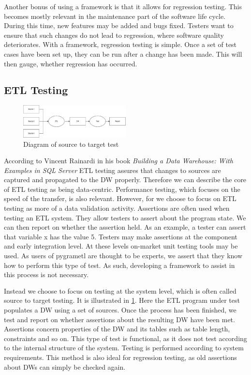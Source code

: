 Another bonus of using a framework is that it allows for regression testing. This becomes mostly relevant in the maintenance part of the software life cycle. During this time, new features may be added and bugs fixed. Testers want to ensure that such changes do not lead to regression, where software quality deteriorates. With a framework, regression testing is simple. Once a set of test cases have been set up, they can be run after a change has been made. This will then gauge, whether regression has occurred.

\subsection{ETL Testing}

\begin{figure}
\centering
\includegraphics[width=0.5\textwidth]{figures/scenario.pdf}
\caption{Diagram of source to target test}
\label{fig:sourcetotarget}
\end{figure}

According to Vincent Rainardi in his book \textit{Building a Data Warehouse: With Examples in SQL Server}\cite{rainardi2007building} ETL testing assures that changes to sources are captured and propagated to the DW properly. Therefore we can describe the core of ETL testing as being data-centric. Performance testing, which focuses on the speed of the transfer, is also relevant. However, for \FW{} we choose to focus on ETL testing as more of a data validation activity. Assertions are often used when testing an ETL system. They allow testers to assert about the program state. We can then report on whether the assertion held. As an example, a tester can assert that variable x has the value 5. Testers may make assertions at the component and early integration level. At these levels on-market unit testing tools may be used. As users of pygrametl are thought to be experts, we assert that they know how to perform this type of test. As such, developing a framework to assist in this process is not necessary.

Instead we choose to focus on testing at the system level, which is often called source to target testing. It is illustrated in \cref{fig:sourcetotarget}. Here the ETL program under test populates a DW using a set of sources. Once the process has been finished, we test and report on whether assertions about the resulting DW have been met. Assertions concern properties of the DW and its tables such as table length, constraints and so on. This type of test is functional, as it does not test according to the internal structure of the system. Testing is performed according to system requirements. This method is also ideal for regression testing, as old assertions about DWs can simply be checked again.


